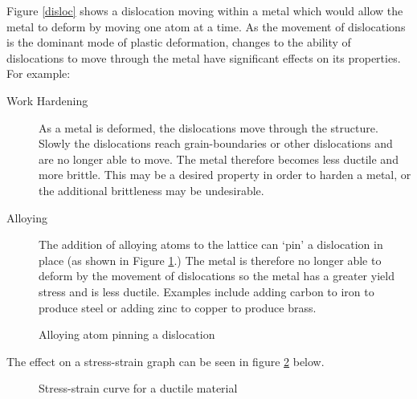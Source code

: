 \documentclass[a4paper,11pt,twoside]{memoir}
\begin{document}
Figure \ref{disloc} shows a dislocation moving within a metal which would allow the metal to deform by moving one atom at a time. As the movement of dislocations is the dominant mode of plastic deformation, changes to the ability of dislocations to move through the metal have significant effects on its properties. For example:
\begin{description}
    \item[Work Hardening] As a metal is deformed, the dislocations move through the structure. Slowly the dislocations reach grain-boundaries or other dislocations and are no longer able to move. The metal therefore becomes less ductile and more brittle. This may be a desired property in order to harden a metal, or the additional brittleness may be undesirable.
    \item[Alloying] The addition of alloying atoms to the lattice can `pin' a dislocation in place (as shown in Figure \ref{alloying}.) The metal is therefore no longer able to deform by the movement of dislocations so the metal has a greater yield stress and is less ductile. Examples include adding carbon to iron to produce steel or adding zinc to copper to produce brass.
\end{description}
\begin{figure}[h]\begin{center}
    \caption{Alloying atom pinning a dislocation}\label{alloying}
\end{center}\end{figure}

The effect on a stress-strain graph can be seen in figure \ref{stress-strain-alloy} below.

\begin{figure}[ht]
    \begin{center}
    \end{center}
    \caption{Stress-strain curve for a ductile material}
    \label{stress-strain-alloy}
\end{figure}
\end{document}
